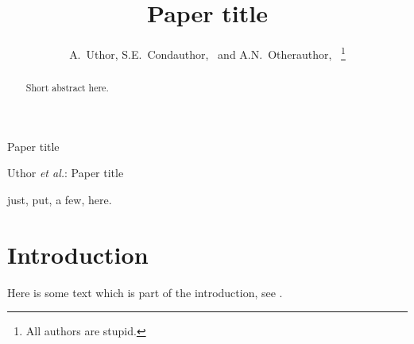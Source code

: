 \documentclass[final, a4paper]{IEEEtran}
\begin{document}
%
\title{Paper title}

\author{A.~Uthor,
        S.E.~Condauthor,~
        and A.N.~Otherauthor,~%
\thanks{All authors are stupid.}%
}

\ifCLASSOPTIONpeerreview
{}%
{Paper title}
\else
{}%
{Uthor \MakeLowercase{\textit{et al.}}: Paper title}
\fi




\maketitle


%
\begin{abstract}
  Short abstract here.
\end{abstract}

\begin{IEEEkeywords}
just,
put,
a few,
here.
\end{IEEEkeywords}

%
\IEEEpeerreviewmaketitle


%
\section{Introduction}
%
Here is some text which is part of the introduction, see
\cite{ma10,mesbahi10}.
\end{document}
